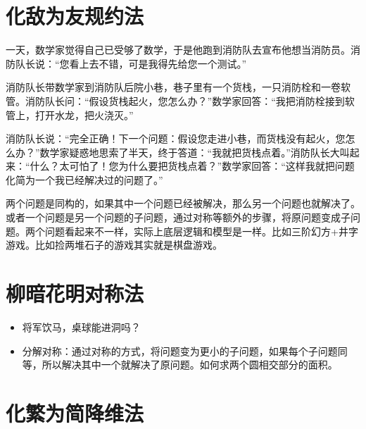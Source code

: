 \documentclass[export, 12pt, letterpaper]{ctexrep}
\newenvironment{shadedquotation}
 {\begin{shaded*}
  \quoting[leftmargin=5pt, rightmargin=5pt, vskip=0pt]
 }
 {\endquoting
 \end{shaded*}
}
\begin{document}
\section{化敌为友规约法}
\begin{shadedquotation}
\noindent
一天，数学家觉得自己已受够了数学，于是他跑到消防队去宣布他想当消防员。消防队长说：“您看上去不错，可是我得先给您一个测试。”
\noindent

\noindent
消防队长带数学家到消防队后院小巷，巷子里有一个货栈，一只消防栓和一卷软管。消防队长问：“假设货栈起火，您怎么办？”数学家回答：“我把消防栓接到软管上，打开水龙，把火浇灭。”
\noindent

\noindent
消防队长说：“完全正确！下一个问题：假设您走进小巷，而货栈没有起火，您怎么办？”数学家疑惑地思索了半天，终于答道：“我就把货栈点着。”消防队长大叫起来：“什么？太可怕了！您为什么要把货栈点着？”数学家回答：“这样我就把问题化简为一个我已经解决过的问题了。”
\end{shadedquotation}


两个问题是同构的，如果其中一个问题已经被解决，那么另一个问题也就解决了。或者一个问题是另一个问题的子问题，通过对称等额外的步骤，将原问题变成子问题。两个问题看起来不一样，实际上底层逻辑和模型是一样。比如三阶幻方+井字游戏。比如捡两堆石子的游戏其实就是棋盘游戏。




\section{柳暗花明对称法}

\begin{itemize}
\item{ 将军饮马，桌球能进洞吗？ }
\item{ 分解对称：通过对称的方式，将问题变为更小的子问题，如果每个子问题同等，所以解决其中一个就解决了原问题。如何求两个圆相交部分的面积。 }
\end{itemize}



\section{化繁为简降维法}
\end{document}
